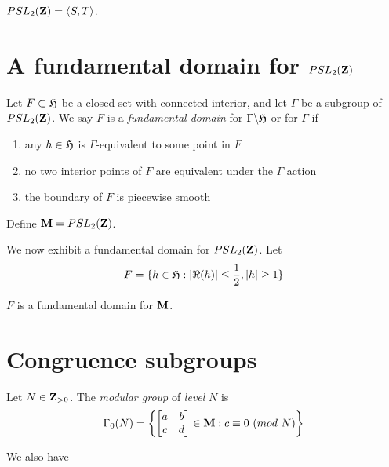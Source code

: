 \begin{prop}
  $PSL_2(\mathbf{Z}) = \langle {S, T} \rangle$.
\end{prop}


\section{A fundamental domain for $PSL_2(\mathbf{Z})$}%
\label{sec:a-fundamental-domain-for-psl2-Z}

\begin{definition}
  Let $F \subset \mathfrak{H}$ be a closed set with connected interior, and
  let $\Gamma$ be a subgroup of $PSL_2(\mathbf{Z})$. We say $F$ is a \emph{fundamental
    domain} for $\Gamma \backslash \mathfrak{H}$ or for $\Gamma$ if
  \begin{enumerate}
  \item any $h \in \mathfrak{H}$ is $\Gamma$-equivalent to some point in $F$
  \item no two interior points of $F$ are equivalent under the $\Gamma$ action
  \item the boundary of $F$ is piecewise smooth
  \end{enumerate}
\end{definition}

Define $\mathbf{M} = PSL_2(\mathbf{Z})$.

We now exhibit a fundamental domain for $PSL_2(\mathbf{Z})$. Let
\[F =  \{h \in \mathfrak{H} : |\Re(h)| \le \frac12, |h| \ge 1 \}\]

\begin{prop}
  $F$ is a fundamental domain for $\mathbf{M}$.
\end{prop}

\section{Congruence subgroups}
\label{sec:congruence-subgroups}

\begin{definition}
  Let $N \in \mathbf{Z}_{>0}$. The \emph{modular group} of \emph{level} $N$ is
  \[\Gamma_0(N) = \left\{\begin{bmatrix} a&b\\c&d \end{bmatrix} \in \mathbf{M} : c
      \equiv 0 \ (\mathnormal{mod}\ N) \right\}\]
\end{definition}

We also have

